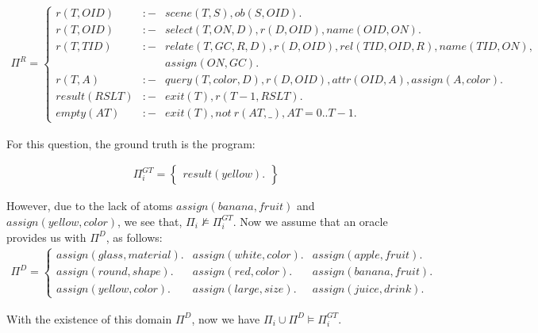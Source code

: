 \begin{example}
    \begin{equation*}
        \begin{array}{c}
            \Pi^{R} = \left\{
            \begin{array}{rcl}
                r(T, OID) &:-& scene(T,S), ob(S,OID). \\
                r(T, OID) &:-& select(T, ON, D), r(D, OID), name(OID, ON). \\
                r(T, TID) &:-& relate(T, GC, R, D), r(D, OID), rel(TID, OID, R), name(TID, ON), \\& & assign(ON,GC). \\
                r(T, A) &:-& query(T, color, D), r(D, OID), attr(OID, A), assign(A, color). \\
                result(RSLT) &:-& exit(T), r(T-1, RSLT). \\
                empty(AT) &:-& exit(T), not\ r(AT,\_), AT=0..T-1.
            \end{array}
            \right.
        \end{array}
    \end{equation*}

    \noindent
    For this question, the ground truth is the program: 

    \begin{equation*}
        \begin{array}{c}
            \Pi^{GT}_{i} = \left\{
            \begin{array}{rcl}
                result(yellow).
            \end{array}
            \right\}
        \end{array}
    \end{equation*}

    \noindent
    However, due to the lack of atoms $assign(banana, fruit)$ and $assign(yellow, color)$, we see that, 
    \mbox{$\Pi_{i} \nvDash \Pi^{GT}_{i}$}. Now we assume that an oracle provides us with $\Pi^{D}$, as follows:
    \begin{equation*}
        \begin{array}{cc}
             \Pi^{D} = \left\{
            \begin{array}{lll}
                assign(glass, material). &
                assign(white, color). &
                assign(apple, fruit). \\
                assign(round, shape). &
                assign(red, color). &
                assign(banana, fruit). \\
                assign(yellow, color). & assign(large,size). &
                assign(juice, drink).
            \end{array}
            \right.
        \end{array}
    \end{equation*}

\noindent
    With the existence of this domain $\Pi^{D}$, now we have $\Pi_{i} \cup \Pi^D \models \Pi^{GT}_{i}$.
\label{ex:techprelim}
\end{example}

